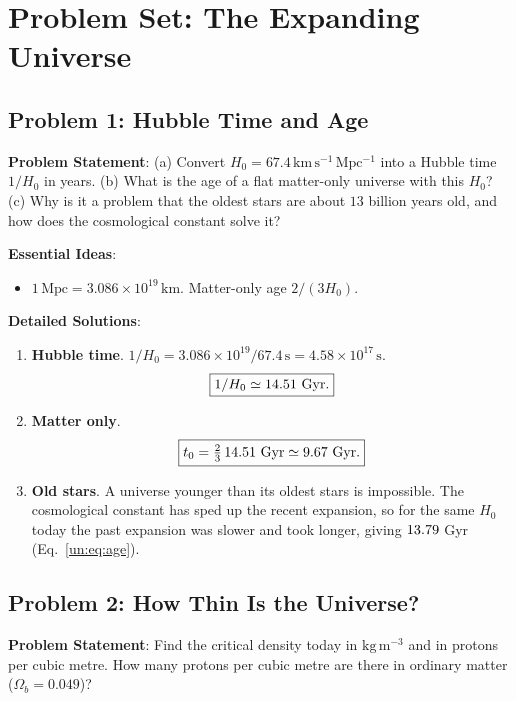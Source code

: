 \section{Problem Set: The Expanding Universe}

\subsection{Problem 1: Hubble Time and Age}
\label{un:prob:age}

\textbf{Problem Statement}: (a) Convert $H_0=67.4\,\mathrm{km\,s^{-1}\,Mpc^{-1}}$ into a Hubble time $1/H_0$ in years. (b) What is the age of a flat matter-only universe with this $H_0$? (c) Why is it a problem that the oldest stars are about $13$ billion years old, and how does the cosmological constant solve it?

\textbf{Essential Ideas}:
\begin{itemize}
	\item $1\,\mathrm{Mpc}=3.086\times10^{19}\,\mathrm{km}$. Matter-only age $2/(3H_0)$.
\end{itemize}

\textbf{Detailed Solutions}:
\begin{enumerate}[label=(\alph*)]
	\item \textbf{Hubble time}. $1/H_0=3.086\times10^{19}/67.4\,\mathrm s=4.58\times10^{17}\,\mathrm s$.
	\[
	\boxed{1/H_0\simeq\SixteenHubbleTime\ \text{Gyr}.}
	\]
	\item \textbf{Matter only}.
	\[
	\boxed{t_0=\tfrac23\,\SixteenHubbleTime\ \text{Gyr}\simeq\SixteenAgeMatterOnly\ \text{Gyr}.}
	\]
	\item \textbf{Old stars}. A universe younger than its oldest stars is impossible. The cosmological constant has sped up the recent expansion, so for the same $H_0$ today the past expansion was slower and took longer, giving $13.79$ Gyr (Eq.~\eqref{un:eq:age}).
\end{enumerate}

\subsection{Problem 2: How Thin Is the Universe?}
\label{un:prob:density}

\textbf{Problem Statement}: Find the critical density today in $\mathrm{kg\,m^{-3}}$ and in protons per cubic metre. How many protons per cubic metre are there in ordinary matter ($\Omega_b=0.049$)?

